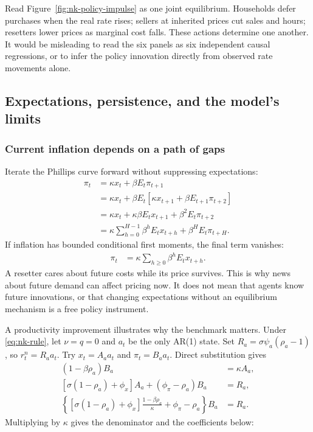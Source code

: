Read Figure~\ref{fig:nk-policy-impulse} as one joint equilibrium. Households defer
purchases when the real rate rises; sellers at inherited prices cut sales and
hours; resetters lower prices as marginal cost falls. These actions determine
one another. It would be misleading to read the six panels as six independent
causal regressions, or to infer the policy innovation directly from observed
rate movements alone.

\subsection{Expectations, persistence, and the model's limits}

\subsubsection{Current inflation depends on a path of gaps}

Iterate the Phillips curve forward without suppressing expectations:
\begin{align}
 \pi_t&=\kappa x_t+\beta E_t\pi_{t+1}\\
 &=\kappa x_t+\beta E_t[\kappa x_{t+1}+\beta E_{t+1}\pi_{t+2}]\\
 &=\kappa x_t+\kappa\beta E_tx_{t+1}+\beta^2E_t\pi_{t+2}\\
 &=\kappa\sum_{h=0}^{H-1}\beta^hE_tx_{t+h}+\beta^HE_t\pi_{t+H}.
\end{align}
If inflation has bounded conditional first moments, the final term vanishes:
\begin{align}
 \pi_t&=\kappa\sum_{h\geq0}\beta^hE_tx_{t+h}.
\end{align}
A resetter cares about future costs while its price survives. This is why
news about future demand can affect pricing now. It does not mean that agents
know future innovations, or that changing expectations without an equilibrium
mechanism is a free policy instrument.

A productivity improvement illustrates why the benchmark matters. Under
\eqref{eq:nk-rule}, let $\nu=q=0$ and $a_t$ be the only AR(1) state. Set
$R_a=\sigma\psi_a(\rho_a-1)$, so $r_t^n=R_a a_t$.
Try $x_t=A_a a_t$ and $\pi_t=B_a a_t$. Direct substitution gives
\begin{align}
 (1-\beta\rho_a)B_a&=\kappa A_a,\\
 [\sigma(1-\rho_a)+\phi_x]A_a+(\phi_\pi-\rho_a)B_a&=R_a,\\
 \left\{[\sigma(1-\rho_a)+\phi_x]
       \frac{1-\beta\rho_a}{\kappa}+\phi_\pi-\rho_a\right\}B_a&=R_a.
\end{align}
Multiplying by $\kappa$ gives the denominator and the coefficients below:

